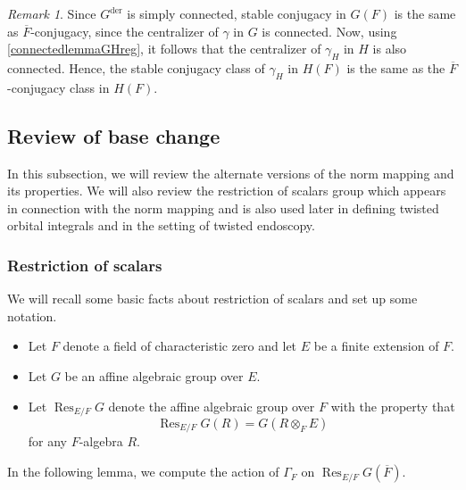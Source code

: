 \documentclass[11pt,a4paper]{article}
\theoremstyle{definition}
\theoremstyle{plain}
\theoremstyle{remark}
\newtheorem{R}[shared]{Remark}
\theoremstyle{plain}
\DeclareMathOperator{\Res}{Res}
\begin{document}
\begin{R}
    Since $G^{\text{der}}$ is simply connected, stable conjugacy in $G(F)$ is the same as $\overline{F}$-conjugacy, since the centralizer of $\gamma$ in $G$ is connected. Now, using \ref{connectedlemmaGHreg}, it follows that the centralizer of $\gamma_H$ in $H$ is also connected. Hence, the stable conjugacy class of $\gamma_H$ in $H(F)$ is the same as the $\overline{F}$-conjugacy class in $H(F)$.
\end{R}

\subsection{Review of base change}\label{2.3}
In this subsection, we will review the alternate versions of the norm mapping and its properties. We will also review the restriction of scalars group which appears in connection with the norm mapping and is also used later in defining twisted orbital integrals and in the setting of twisted endoscopy.
\subsubsection{Restriction of scalars}\label{restrictionofscalars}
We will recall some basic facts about restriction of scalars and set up some notation.
\begin{itemize}
    \item Let $F$ denote a field of characteristic zero and let $E$ be a finite extension of $F$. 
    \item Let $G$ be an affine algebraic group over $E$.
    \item Let $\Res_{E/F}G$ denote the affine algebraic group over $F$ with the property that
    $$\Res_{E/F}G(R) = G(R \otimes_F E)$$
    for any $F$-algebra $R$.
\end{itemize}

In the following lemma, we compute the action of $\Gamma_F$ on $\Res_{E/F}G(\overline{F})$.
\end{document}
